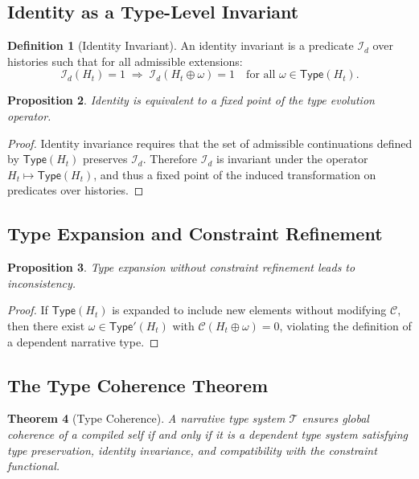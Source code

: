 \documentclass[12pt, a4paper]{article}
\theoremstyle{plain}
\newtheorem{theorem}{Theorem}[section]
\newtheorem{proposition}[theorem]{Proposition}
\theoremstyle{definition}
\newtheorem{definition}[theorem]{Definition}
\theoremstyle{remark}
\begin{document}
\subsection{Identity as a Type-Level Invariant}

\begin{definition}[Identity Invariant]
An identity invariant is a predicate $\mathcal{I}_d$ over histories such that for all admissible extensions:
\[
\mathcal{I}_d(H_t) = 1 \;\Rightarrow\; \mathcal{I}_d(H_t \oplus \omega) = 1 \quad \text{for all } \omega \in \mathsf{Type}(H_t).
\]
\end{definition}

\begin{proposition}
Identity is equivalent to a fixed point of the type evolution operator.
\end{proposition}

\begin{proof}
Identity invariance requires that the set of admissible continuations defined by $\mathsf{Type}(H_t)$ preserves $\mathcal{I}_d$. Therefore $\mathcal{I}_d$ is invariant under the operator $H_t \mapsto \mathsf{Type}(H_t)$, and thus a fixed point of the induced transformation on predicates over histories.
\end{proof}

\subsection{Type Expansion and Constraint Refinement}

\begin{proposition}
Type expansion without constraint refinement leads to inconsistency.
\end{proposition}

\begin{proof}
If $\mathsf{Type}(H_t)$ is expanded to include new elements without modifying $\mathcal{C}$, then there exist $\omega \in \mathsf{Type}'(H_t)$ with $\mathcal{C}(H_t \oplus \omega) = 0$, violating the definition of a dependent narrative type.
\end{proof}

\subsection{The Type Coherence Theorem}

\begin{theorem}[Type Coherence]
A narrative type system $\mathcal{T}$ ensures global coherence of a compiled self if and only if it is a dependent type system satisfying type preservation, identity invariance, and compatibility with the constraint functional.
\end{theorem}
\end{document}
